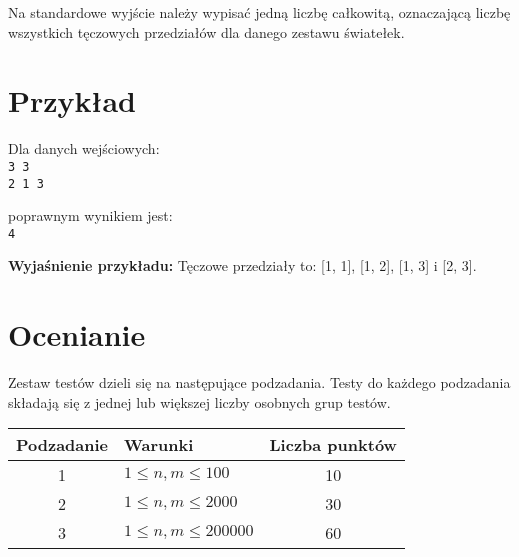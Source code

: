 \documentclass[10pt]{article}
\begin{document}
    Na standardowe wyjście należy wypisać jedną liczbę całkowitą, oznaczającą liczbę wszystkich tęczowych przedziałów dla danego zestawu światełek.


    \section*{Przykład}
    
    \noindent
    \begin{minipage}[t]{0.5\textwidth}
        Dla danych wejściowych:\vspace{1ex}\\
        \texttt{3 3\\2 1 3}
    \end{minipage}
    \begin{minipage}[t]{0.5\textwidth}
        poprawnym wynikiem jest:\vspace{1ex}\\
        \texttt{4}
    \end{minipage}
    
    \vspace{2ex}
    \noindent\textbf{Wyjaśnienie przykładu:} Tęczowe przedziały to: [1, 1], [1, 2], [1, 3] i [2, 3]. 
    
    
    

    \section*{Ocenianie}
        
    Zestaw testów dzieli się na następujące podzadania. Testy do każdego podzadania składają się z jednej lub większej liczby osobnych grup testów.
    
    \begin{center}
        \begin{tabular}{ |c|p{9cm}|c| }
            \hline
            \textbf{Podzadanie} & \textbf{Warunki} & \textbf{Liczba punktów}\\
            \hline
            1 & $1 \leq n, m \leq 100$ & 10\\
            \hline
            2 & $1 \leq n, m \leq 2000$ & 30\\
            \hline
            3 & $1 \leq n, m \leq 200000$ & 60\\
            \hline
            
        \end{tabular}
    \end{center}
\end{document}

